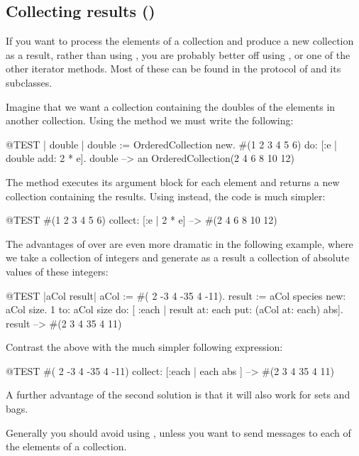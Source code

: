 \documentclass[a4paper,10pt,twoside]{book}
\begin{document}
\subsection{Collecting results ()}
If you want to process the elements of a collection and produce a new collection as a result, rather than using , you are probably better off using , or one of the other iterator methods.
Most of these can be found in the  protocol of  and its subclasses.

Imagine that we want a collection containing the doubles of the elements in another collection. Using the method  we must write the following:

\begin{code}{@TEST | double |}
double := OrderedCollection new.
#(1 2 3 4 5 6) do: [:e | double add: 2 * e].
double --> an OrderedCollection(2 4 6 8 10 12)
\end{code}

\noindent
The method  executes its argument block for each element and returns a new collection containing the results. 
Using  instead, the code is much simpler:
\begin{code}{@TEST}
#(1 2 3 4 5 6) collect: [:e | 2 * e] --> #(2 4 6 8 10 12)
\end{code}

The advantages of  over  are even more dramatic in the following example, where we take a collection of integers and generate as a result a collection of absolute values of these integers:

\begin{code}{@TEST |aCol result|}
aCol :=  #( 2 -3 4 -35 4 -11).
result := aCol species new: aCol size.
1 to: aCol size do: [ :each | result at: each put: (aCol at: each) abs].
result --> #(2 3 4 35 4 11)
\end{code}
\noindent
Contrast the above with the much simpler following expression:
\begin{code}{@TEST}
#( 2 -3 4 -35 4 -11) collect: [:each | each abs ] --> #(2 3 4 35 4 11)
\end{code}
\noindent
A further advantage of the second solution is that it will also work for sets and bags.

Generally you should avoid using , unless you want to send messages to each of the elements of a collection.
\end{document}
